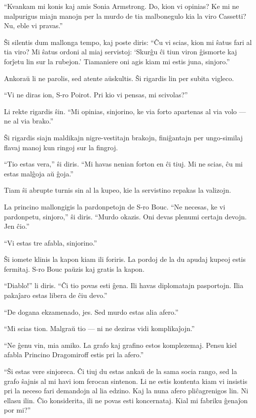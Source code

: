 ``Kvankam mi konis kaj amis Sonia Armstrong. Do, kion vi opinias? Ke mi ne malpurigus miajn manojn per la murdo de tia malbonegulo kia la viro Cassetti? Nu, eble vi pravas.''

Ŝi silentis dum mallonga tempo, kaj poste diris: ``Ĉu vi scias, kion mi ŝatus fari al tia viro? Mi ŝatus ordoni al miaj servistoj: `Skurĝu ĉi tiun viron ĝismorte kaj forĵetu lin sur la rubejon.' Tiamaniere oni agis kiam mi estis juna, sinjoro.''

Ankoraŭ li ne parolis, sed atente aŭskultis. Ŝi rigardis lin per subita vigleco.

``Vi ne diras ion, S-ro Poirot. Pri kio vi pensas, mi scivolas?''

Li rekte rigardis ŝin. ``Mi opinias, sinjorino, ke via forto apartenas al via volo --- ne al via brako.''

Ŝi rigardis siajn maldikajn nigre-vestitajn brakojn, finiĝantajn per ungo-similaj flavaj manoj kun ringoj sur la fingroj.

``Tio estas vera,'' ŝi diris. ``Mi havas nenian forton en ĉi tiuj. Mi ne scias, ĉu mi estas malĝoja aŭ ĝoja.''

Tiam ŝi abrupte turnis sin al la kupeo, kie la servistino repakas la valizojn.

La princino mallongigis la pardonpetojn de S-ro Bouc. ``Ne necesas, ke vi pardonpetu, sinjoro,'' ŝi diris. ``Murdo okazis. Oni devas plenumi certajn devojn. Jen ĉio.''

``Vi estas tre afabla, sinjorino.''

Ŝi iomete klinis la kapon kiam ili foriris. La pordoj de la du apudaj kupeoj estis fermitaj. S-ro Bouc paŭzis kaj gratis la kapon.

``Diablo!'' li diris. ``Ĉi tio povas esti ĝena. Ili havas diplomatajn pasportojn. Ilia pakaĵaro estas libera de ĉiu devo.''

``De dogana ekzamenado, jes. Sed murdo estas alia afero.''

``Mi scias tion. Malgraŭ tio --- ni ne deziras vidi komplikaĵojn.''

``Ne ĝenu vin, mia amiko. La grafo kaj grafino estos komplezemaj. Pensu kiel afabla Princino Dragomiroff estis pri la afero.''

``Ŝi estas vere sinjoreca. Ĉi tiuj du estas ankaŭ de la sama socia rango, sed la grafo ŝajnis al mi havi iom ferocan sintenon. Li ne estis kontenta kiam vi insistis pri la neceso fari demandojn al lia edzino. Kaj la nuna afero pliĉagrenigos lin. Ni ellasu ilin. Ĉio konsiderita, ili ne povas esti koncernataj. Kial mi fabriku ĝenaĵon por mi?''

